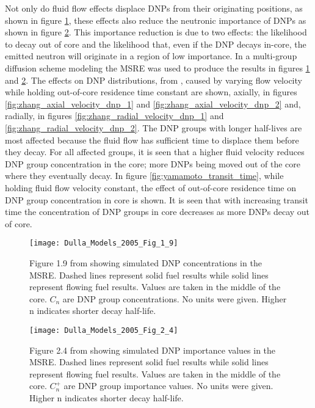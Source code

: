 \documentclass[review]{elsarticle}
\begin{document}
\par Not only do fluid flow effects displace DNPs from their originating positions,
as shown in figure \ref{fig:dulla_msre_dnp_displacement}, these effects also
reduce the neutronic importance of DNPs as shown in figure
\ref{fig:dulla_msre_dnp_importance}. This importance reduction is due to two
effects: the likelihood to decay out of core and the likelihood that, even if the
DNP decays in-core, the emitted neutron will originate in a region of low
importance. In \cite{dulla_models_2005} a multi-group
diffusion scheme modeling the MSRE was used to produce the results in figures
\ref{fig:dulla_msre_dnp_displacement} and \ref{fig:dulla_msre_dnp_importance}.
The effects on DNP distributions, from \cite{zhang_development_2009-1}, caused
by varying flow velocity while holding out-of-core residence time constant are
shown, axially, in figures \ref{fig:zhang_axial_velocity_dnp_1} and 
\ref{fig:zhang_axial_velocity_dnp_2} and, radially, in figures
\ref{fig:zhang_radial_velocity_dnp_1} and \ref{fig:zhang_radial_velocity_dnp_2}.
The DNP groups with longer half-lives are most affected because the
fluid flow has sufficient time to displace them before they decay. For all
affected groups, it is seen that a higher fluid velocity reduces DNP group
concentration in the core; more DNPs being moved out of the core where they
eventually decay. In figure \ref{fig:yamamoto_transit_time}, while holding fluid flow velocity constant, the effect of
out-of-core residence time on DNP group concentration
in core is shown. It is seen that with increasing transit time the concentration
of DNP groups in core decreases as more DNPs decay out of core.   

\begin{figure}[h]
   \centering
   \texttt{[image: Dulla\_Models\_2005\_Fig\_1\_9]}
   \caption{Figure 1.9 from \cite{dulla_models_2005} showing simulated DNP concentrations in the
    MSRE. Dashed lines represent
    solid fuel results while solid lines represent flowing fuel results. Values
    are taken in the middle of the core. $C_{n}$ are DNP group concentrations. No
    units were given. Higher n indicates shorter decay half-life.}
   \label{fig:dulla_msre_dnp_displacement}
\end{figure}

\begin{figure}[h]
   \centering
   \texttt{[image: Dulla\_Models\_2005\_Fig\_2\_4]}
   \caption{Figure 2.4 from \cite{dulla_models_2005} showing simulated DNP importance values in the
    MSRE. Dashed lines represent
    solid fuel results while solid lines represent flowing fuel results. Values
    are taken in the middle of the core. $C_{n}^{+}$ are DNP group importance values. 
    No units were given. Higher n indicates shorter decay half-life.}
   \label{fig:dulla_msre_dnp_importance}
\end{figure}
\end{document}
